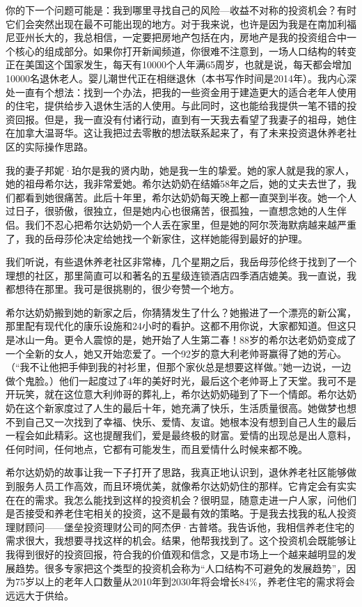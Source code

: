 你的下一个问题可能是：我到哪里寻找自己的风险—收益不对称的投资机会？有时它们会突然出现在最不可能出现的地方。对于我来说，也许是因为我是在南加利福尼亚州长大的，我总相信，一定要把房地产包括在内，房地产是我的投资组合中一个核心的组成部分。如果你打开新闻频道，你很难不注意到，一场人口结构的转变正在美国这个国家发生，每天有10000个人年满65周岁，也就是说，每天都会增加10000名退休老人。婴儿潮世代正在相继退休（本书写作时间是2014年）。我内心深处一直有个想法：找到一个办法，把我的一些资金用于建造更大的适合老年人使用的住宅，提供给步入退休生活的人使用。与此同时，这也能给我提供一笔不错的投资回报。但是，我一直没有付诸行动，直到有一天我去看望了我妻子的祖母，她住在加拿大温哥华。这让我把过去零散的想法联系起来了，有了未来投资退休养老社区的实际操作思路。



我的妻子邦妮·珀尔是我的贤内助，她是我一生的挚爱。她的家人就是我的家人，她的祖母希尔达，我非常爱她。希尔达奶奶在结婚58年之后，她的丈夫去世了，我们都看到她很痛苦。此后十年里，希尔达奶奶每天晚上都一直哭到半夜。她一个人过日子，很骄傲，很独立，但是她内心也很痛苦，很孤独，一直想念她的人生伴侣。我们不忍心把希尔达奶奶一个人丢在家里，但是她的阿尔茨海默病越来越严重了，我的岳母莎伦决定给她找一个新家住，这样她能得到最好的护理。

我们听说，有些退休养老社区非常棒，几个星期之后，我岳母莎伦终于找到了一个理想的社区，那里简直可以和著名的五星级连锁酒店四季酒店媲美。我一直说，我都想待在那里。我可是很挑剔的，很少夸赞一个地方。

希尔达奶奶搬到她的新家之后，你猜猜发生了什么？她搬进了一个漂亮的新公寓，那里配有现代化的康乐设施和24小时的看护。这都不用你说，大家都知道。但这只是冰山一角。更令人震惊的是，她开始了人生第二春！88岁的希尔达老奶奶变成了一个全新的女人，她又开始恋爱了。一个92岁的意大利老帅哥赢得了她的芳心。（“我不让他把手伸到我的衬衫里，但那个家伙总是想要这样做。”她一边说，一边做个鬼脸。）他们一起度过了4年的美好时光，最后这个老帅哥上了天堂。我可不是开玩笑，就在这位意大利帅哥的葬礼上，希尔达奶奶碰到了下一个情郎。希尔达奶奶在这个新家度过了人生的最后十年，她充满了快乐，生活质量很高。她做梦也想不到自己又一次找到了幸福、快乐、爱情、友谊。她根本没有想到自己人生的最后一程会如此精彩。这也提醒我们，爱是最终极的财富。爱情的出现总是出人意料，任何时间，任何地点，它都有可能发生，而且爱情什么时候来都不晚。

希尔达奶奶的故事让我一下子打开了思路，我真正地认识到，退休养老社区能够做到服务人员工作高效，而且环境优美，就像希尔达奶奶住的那样。它肯定会有实实在在的需求。我怎么能找到这样的投资机会？很明显，随意走进一户人家，问他们是否接受和养老住宅相关的投资，这不是最有效的策略。于是我去找我的私人投资理财顾问——堡垒投资理财公司的阿杰伊·古普塔。我告诉他，我相信养老住宅的需求很大，我想要寻找这样的机会。结果，他帮我找到了。这个投资机会既能够让我得到很好的投资回报，符合我的价值观和信念，又是市场上一个越来越明显的发展趋势。很多专家把这个类型的投资机会称为“人口结构不可避免的发展趋势”，因为75岁以上的老年人口数量从2010年到2030年将会增长84\%，养老住宅的需求将会远远大于供给。


